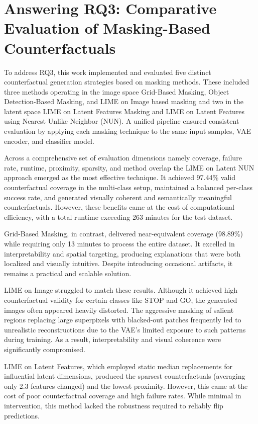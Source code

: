 \section{Answering RQ3: Comparative Evaluation of Masking-Based Counterfactuals}

To address RQ3, this work implemented and evaluated five distinct counterfactual generation strategies based on masking methods. These included three methods operating in the image space Grid-Based Masking, Object Detection-Based Masking, and LIME on Image based masking and two in the latent space LIME on Latent Features Masking and LIME on Latent Features using Nearest Unlike Neighbor (NUN). A unified pipeline ensured consistent evaluation by applying each masking technique to the same input samples, VAE encoder, and classifier model.

Across a comprehensive set of evaluation dimensions namely coverage, failure rate, runtime, proximity, sparsity, and method overlap the LIME on Latent NUN approach emerged as the most effective technique. It achieved 97.44\% valid counterfactual coverage in the multi-class setup, maintained a balanced per-class success rate, and generated visually coherent and semantically meaningful counterfactuals. However, these benefits came at the cost of computational efficiency, with a total runtime exceeding 263 minutes for the test dataset.

Grid-Based Masking, in contrast, delivered near-equivalent coverage (98.89\%) while requiring only 13 minutes to process the entire dataset. It excelled in interpretability and spatial targeting, producing explanations that were both localized and visually intuitive. Despite introducing occasional artifacts, it remains a practical and scalable solution.

LIME on Image struggled to match these results. Although it achieved high counterfactual validity for certain classes like STOP and GO, the generated images often appeared heavily distorted. The aggressive masking of salient regions replacing large superpixels with blacked-out patches frequently led to unrealistic reconstructions due to the VAE’s limited exposure to such patterns during training. As a result, interpretability and visual coherence were significantly compromised.

LIME on Latent Features, which employed static median replacements for influential latent dimensions, produced the sparsest counterfactuals (averaging only 2.3 features changed) and the lowest proximity. However, this came at the cost of poor counterfactual coverage and high failure rates. While minimal in intervention, this method lacked the robustness required to reliably flip predictions.

